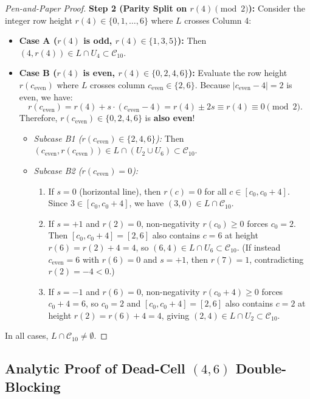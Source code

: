 \documentclass[11pt,reqno]{amsart}
\theoremstyle{plain}
\theoremstyle{definition}
\theoremstyle{remark}
\begin{document}
\begin{proof}[Pen-and-Paper Proof]
\textbf{Step 2 (Parity Split on $r(4) \pmod 2$):}
Consider the integer row height $r(4) \in \{0, 1, \dots, 6\}$ where $L$ crosses Column 4:
\begin{itemize}
    \item \textbf{Case A ($r(4)$ is odd, $r(4) \in \{1, 3, 5\}$):}
    Then $(4, r(4)) \in L \cap U_4 \subset \mathcal{C}_{10}$.
    \item \textbf{Case B ($r(4)$ is even, $r(4) \in \{0, 2, 4, 6\}$):}
    Evaluate the row height $r(c_{\text{even}})$ where $L$ crosses column $c_{\text{even}} \in \{2, 6\}$. Because $|c_{\text{even}} - 4| = 2$ is even, we have:
    \begin{equation}
    r(c_{\text{even}}) = r(4) + s \cdot (c_{\text{even}} - 4) = r(4) \pm 2s \equiv r(4) \equiv 0 \pmod 2.
    \end{equation}
    Therefore, $r(c_{\text{even}}) \in \{0, 2, 4, 6\}$ is \textbf{also even}!
    \begin{itemize}
        \item \emph{Subcase B1 ($r(c_{\text{even}}) \in \{2, 4, 6\}$):} Then $(c_{\text{even}}, r(c_{\text{even}})) \in L \cap (U_2 \cup U_6) \subset \mathcal{C}_{10}$.
        \item \emph{Subcase B2 ($r(c_{\text{even}}) = 0$):}
        \begin{enumerate}
            \item If $s = 0$ (horizontal line), then $r(c) = 0$ for all $c \in [c_0, c_0+4]$. Since $3 \in [c_0, c_0+4]$, we have $(3, 0) \in L \cap \mathcal{C}_{10}$.
            \item If $s = +1$ and $r(2) = 0$, non-negativity $r(c_0) \ge 0$ forces $c_0 = 2$. Then $[c_0, c_0+4] = [2, 6]$ also contains $c = 6$ at height $r(6) = r(2) + 4 = 4$, so $(6, 4) \in L \cap U_6 \subset \mathcal{C}_{10}$. (If instead $c_{\text{even}} = 6$ with $r(6) = 0$ and $s = +1$, then $r(7) = 1$, contradicting $r(2) = -4 < 0$.)
            \item If $s = -1$ and $r(6) = 0$, non-negativity $r(c_0+4) \ge 0$ forces $c_0 + 4 = 6$, so $c_0 = 2$ and $[c_0, c_0+4] = [2, 6]$ also contains $c = 2$ at height $r(2) = r(6) + 4 = 4$, giving $(2, 4) \in L \cap U_2 \subset \mathcal{C}_{10}$.
        \end{enumerate}
    \end{itemize}
\end{itemize}
In all cases, $L \cap \mathcal{C}_{10} \ne \emptyset$.
\end{proof}

\subsection{Analytic Proof of Dead-Cell $(4,6)$ Double-Blocking}
\end{document}
